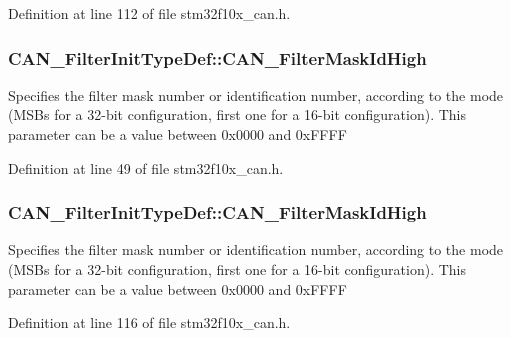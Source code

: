 Definition at line 112 of file stm32f10x\+\_\+can.\+h.

\subsubsection[{\texorpdfstring{C\+A\+N\+\_\+\+Filter\+Mask\+Id\+High}{CAN_FilterMaskIdHigh}}]{ C\+A\+N\+\_\+\+Filter\+Init\+Type\+Def\+::\+C\+A\+N\+\_\+\+Filter\+Mask\+Id\+High}\hypertarget{struct_c_a_n___filter_init_type_def_a10d78971c14d79c43d11ee0acf591796}{}\label{struct_c_a_n___filter_init_type_def_a10d78971c14d79c43d11ee0acf591796}
Specifies the filter mask number or identification number, according to the mode (M\+S\+Bs for a 32-\/bit configuration, first one for a 16-\/bit configuration). This parameter can be a value between 0x0000 and 0x\+F\+F\+FF 

Definition at line 49 of file stm32f10x\+\_\+can.\+h.

\subsubsection[{\texorpdfstring{C\+A\+N\+\_\+\+Filter\+Mask\+Id\+High}{CAN_FilterMaskIdHigh}}]{ C\+A\+N\+\_\+\+Filter\+Init\+Type\+Def\+::\+C\+A\+N\+\_\+\+Filter\+Mask\+Id\+High}\hypertarget{struct_c_a_n___filter_init_type_def_a6f34539615e6484f266b46aa8f362a91}{}\label{struct_c_a_n___filter_init_type_def_a6f34539615e6484f266b46aa8f362a91}
Specifies the filter mask number or identification number, according to the mode (M\+S\+Bs for a 32-\/bit configuration, first one for a 16-\/bit configuration). This parameter can be a value between 0x0000 and 0x\+F\+F\+FF 

Definition at line 116 of file stm32f10x\+\_\+can.\+h.

